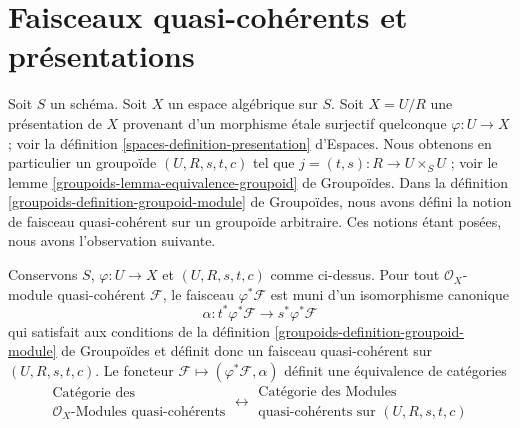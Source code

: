 \section{Faisceaux quasi-cohérents et présentations}
\label{section-quasi-coherent-presentation}

\noindent
Soit $S$ un schéma. Soit $X$ un espace algébrique sur $S$.
Soit $X = U/R$ une présentation de $X$ provenant d'un morphisme
\'etale surjectif quelconque $\varphi : U \to X$ ; voir la
définition \ref{spaces-definition-presentation} d'Espaces.
Nous obtenons en particulier un groupoïde $(U, R, s, t, c)$ tel que
$j = (t, s) : R \to U \times_S U$ ; voir le
lemme \ref{groupoids-lemma-equivalence-groupoid} de Groupoïdes.
Dans la
définition \ref{groupoids-definition-groupoid-module} de Groupoïdes,
nous avons défini la notion de faisceau quasi-cohérent
sur un groupoïde arbitraire. Ces notions étant posées, nous avons
l'observation suivante.

\begin{proposition}
\label{proposition-quasi-coherent}
Conservons $S$, $\varphi : U \to X$ et $(U, R, s, t, c)$ comme ci-dessus.
Pour tout $\mathcal{O}_X$-module quasi-cohérent $\mathcal{F}$, le
faisceau $\varphi^*\mathcal{F}$ est muni d'un
isomorphisme canonique
$$
\alpha : t^*\varphi^*\mathcal{F} \longrightarrow s^*\varphi^*\mathcal{F}
$$
qui satisfait aux conditions de la
définition \ref{groupoids-definition-groupoid-module} de Groupoïdes
et définit donc un faisceau quasi-cohérent sur $(U, R, s, t, c)$.
Le foncteur $\mathcal{F} \mapsto (\varphi^*\mathcal{F}, \alpha)$
définit une équivalence de catégories
$$
\begin{matrix}
\text{Catégorie des} \\
\mathcal{O}_X\text{-Modules quasi-cohérents}
\end{matrix}
\longleftrightarrow
\begin{matrix}
\text{Catégorie des Modules}\\
\text{quasi-cohérents sur }(U, R, s, t, c)
\end{matrix}
$$
\end{proposition}

